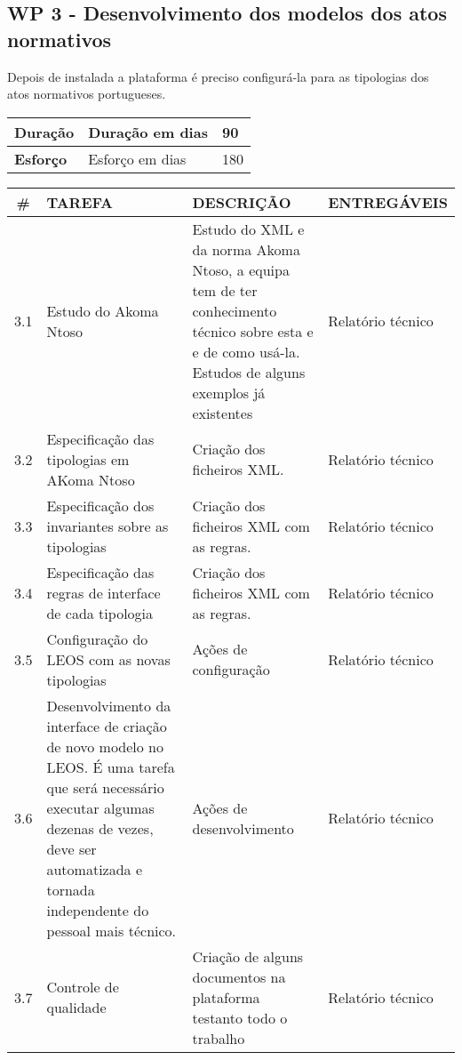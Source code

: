 \subsection{WP 3 - Desenvolvimento dos modelos dos atos normativos}

Depois de instalada a plataforma é preciso configurá-la para as tipologias dos atos normativos portugueses.

\begin{tabular}{|p{3cm}|p{5cm}|l|}
    \hline
    \textbf{Duração} & Duração em dias & 90 \\
    \hline
    \textbf{Esforço} & Esforço em dias & 180\\
    \hline
\end{tabular}
    
\vspace{0.5cm}

\begin{longtable}{|c|p{5cm}|p{7cm}|p{3cm}|}
    \hline
    \# & \textbf{TAREFA} & \textbf{DESCRIÇÃO} & \textbf{ENTREGÁVEIS} \\
    \hline
    3.1 & Estudo do Akoma Ntoso & Estudo do XML e da norma Akoma Ntoso, a equipa tem de ter conhecimento técnico sobre esta e 
    e de como usá-la. Estudos de alguns exemplos já existentes & Relatório técnico \\
    \hline
    3.2 & Especificação das tipologias em AKoma Ntoso & Criação dos ficheiros XML. & Relatório técnico \\
    \hline
    3.3 & Especificação dos invariantes sobre as tipologias & Criação dos ficheiros XML com as regras. 
    & Relatório técnico \\
    \hline
    3.4 & Especificação das regras de interface de cada tipologia & Criação dos ficheiros XML com as regras. 
    & Relatório técnico \\
    \hline
    3.5 & Configuração do LEOS com as novas tipologias & Ações de configuração & Relatório técnico \\
    \hline
    3.6 & Desenvolvimento da interface de criação de novo modelo no LEOS. É uma tarefa que será necessário executar algumas 
    dezenas de vezes, deve ser automatizada e tornada independente do pessoal mais técnico.
    & Ações de desenvolvimento & Relatório técnico \\
    \hline
    3.7 & Controle de qualidade & Criação de alguns documentos na plataforma testanto todo o trabalho & Relatório técnico \\
    \hline
\end{longtable}


